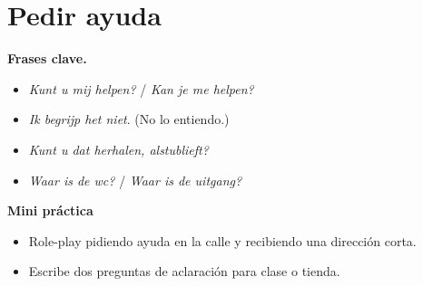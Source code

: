 \section{Pedir ayuda}
\textbf{Frases clave.}
\begin{itemize}[leftmargin=*]
  \item \textit{Kunt u mij helpen?} / \textit{Kan je me helpen?}
  \item \textit{Ik begrijp het niet}. (No lo entiendo.)
  \item \textit{Kunt u dat herhalen, alstublieft?}
  \item \textit{Waar is de wc?} / \textit{Waar is de uitgang?}
\end{itemize}

\textbf{Mini práctica}
\begin{itemize}[leftmargin=*]
  \item Role-play pidiendo ayuda en la calle y recibiendo una dirección corta.
  \item Escribe dos preguntas de aclaración para clase o tienda.
\end{itemize}
